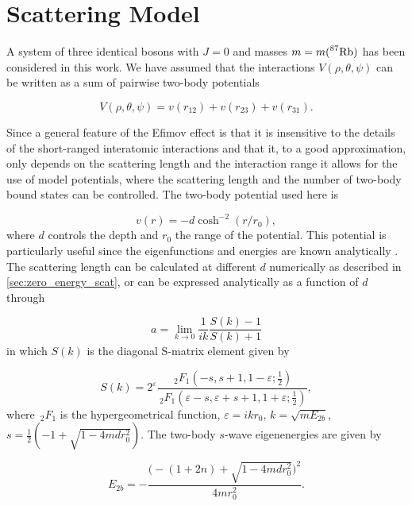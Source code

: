 \chapter{Scattering Model}\label{chapter:scattering_model}
A system of three identical bosons with $J=0$ and masses $m = m( \prescript{87}{}{\mathrm{Rb}})$ has been considered in this work. We have assumed that the interactions $V(\rho,\theta,\psi)$ can be written as a sum of pairwise two-body potentials   

\begin{equation}\label{eq:potential_sum}
V(\rho,\theta,\psi) = v(r_{12}) + v(r_{23}) + v(r_{31}).
\end{equation} 

Since a general feature of the Efimov effect is that it is insensitive to the details of the short-ranged interatomic interactions and that it, to a good approximation, only depends on the scattering length and the interaction range it allows for the use of model potentials, where the scattering length and the number of two-body bound states can be controlled. The two-body potential used here is  

\begin{equation}\label{eq:two_b_potential}
v(r) = -d\cosh^{-2}{(r/r_0)},
\end{equation}
where $d$ controls the depth and $r_0$ the range of the potential. This potential is particularly useful since the eigenfunctions and energies are known analytically \cite{Landau1965Quantum}. The scattering length can be calculated at different $d$ numerically as described in \cref{sec:zero_energy_scat}, or can be expressed analytically as a function of $d$ through 

\begin{equation}
a = \lim_{k \to 0} \frac{1}{ik} \frac{S(k)-1}{S(k)+1}
\end{equation}
in which $S(k)$ is the diagonal S-matrix element given by

\begin{equation}
S(k) = 2^{\varepsilon} \frac{\,_2F_1(-s, s+1, 1-\varepsilon;\frac{1}{2})}{\,_2F_1(\varepsilon-s, \varepsilon + s+1, 1+\varepsilon;\frac{1}{2})},
\end{equation}
where $\,_2F_1$ is the hypergeometrical function, $\varepsilon = ikr_0$, $k = \sqrt{mE_{2b}}$, $s = \frac{1}{2}(-1 + \sqrt{1-4 m d r_0^2})$. The two-body $s$-wave eigenenergies are given by

\begin{equation}\label{eq:exact_2b}
E_{2b} = -\frac{\Big(-(1+2n)+\sqrt{1-4mdr_0^2}\Big)^2}{4mr_0^2}.
\end{equation}

